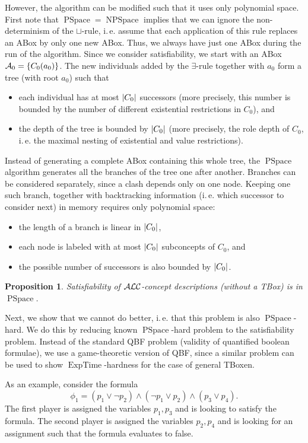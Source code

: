 \documentclass[openany]{scrbook}
\theoremstyle{break}
\newtheorem{Proposition}[Theorem]{Proposition}
\theoremstyle{nonumberbreak}
\theoremstyle{nonumberplain}
\theoremstyle{nonumberbreak}
\newcommand{\then}{\Longrightarrow}
\newcommand{\abs}[2][]{\left|{#2}\right|\ifx#1\then\else_{#1}\fi}
\newcommand{\set}[1]{\left\{#1\right\}}
\newcommand{\ie}{i{.}\,e{.}\xspace}
\newcommand{\ALC}{{\cal A}{\cal L}{\cal C}}
\newcommand{\PSpace}{\operatorname{PSpace}}
\newcommand{\NPSpace}{\operatorname{NPSpace}}
\newcommand{\ExpTime}{\operatorname{ExpTime}}
\begin{document}
However, the algorithm can be modified such that it uses only
polynomial space. First note that $\PSpace = \NPSpace$ implies that we
can ignore the non-determinism of the $\sqcup$-rule, \ie assume that
each application of this rule replaces an ABox by only one new
ABox. Thus, we always have just one ABox during the run of the
algorithm. Since we consider satisfiability, we start with an ABox
${\cal A}_0 = \set{C_0(a_0)}$. The new individuals added by the
$\exists$-rule together with $a_0$ form a tree (with root $a_0$) such
that
\begin{itemize}
\item each individual has at most $\abs{C_0}$ successors (more
  precisely, this number is bounded by the number of different
  existential restrictions in $C_0$), and
\item the depth of the tree is bounded by $\abs{C_0}$ (more
  precisely, the role depth of $C_0$, \ie the maximal nesting of
  existential and value restrictions).
\end{itemize}
Instead of generating a complete ABox containing this whole tree, the
$\PSpace$ algorithm generates all the branches of the tree one after
another. Branches can be considered separately, since a clash depends
only on one node. Keeping one such branch, together with backtracking
information (\ie which successor to consider next) in memory requires
only polynomial space:
\begin{itemize}
\item the length of a branch is linear in $\abs{C_0}$,
\item each node is labeled with at most $\abs{C_0}$ subconcepts of
  $C_0$, and
\item the possible number of successors is also bounded by $\abs{C_0}$.
\end{itemize}

\begin{Proposition}
  \label{6.2}
  Satisfiability of $\ALC$-concept descriptions (without a TBox) is in
  $\PSpace$.
\end{Proposition}

Next, we show that we cannot do better, \ie that this problem is also
$\PSpace$-hard. We do this by reducing  known $\PSpace$-hard problem
to the satisfiability problem. Instead of the standard QBF problem
(validity of quantified boolean formulae), we use a game-theoretic
version of QBF, since a similar problem can be used to show
$\ExpTime$-hardness for the case of general TBoxen.

As an example, consider the formula
\begin{equation*}
  \phi_1 = (p_1 \vee \neg p_2) \wedge (\neg p_1 \vee p_2) \wedge (p_3
  \vee p_4).
\end{equation*}
The first player is assigned the variables $p_1, p_3$ and is looking
to satisfy the formula. The second player is assigned the variables
$p_2, p_4$ and is looking for an assignment such that the formula
evaluates to false.
\end{document}
